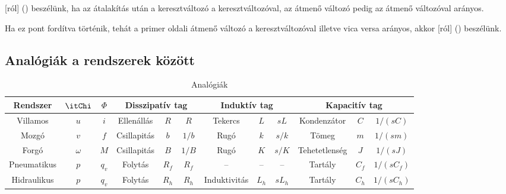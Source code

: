 \documentclass[../main.tex]{subfiles}
\begin{document}
[ról] () beszélünk, ha az átalakítás után a keresztváltozó
a keresztváltozóval, az átmenő változó pedig az átmenő változóval arányos.

Ha ez pont fordítva történik, tehát a primer oldali átmenő változó a keresztváltozóval
illetve vica versa arányos, akkor [ról] () beszélünk.

\subsection{Analógiák a rendszerek között}

\bgroup
\def\arraystretch{1.2}
\begin{table}[H]
  \centering
  \begin{adjustbox}{angle=90}
    \begin{tabular}{| c | c | c || c | c | c || c | c |c	|| c | c | c |}
      \hline
      Rendszer                              & $\itChi$ & $\varPhi$  &
      \multicolumn{3}{c||}{Disszipatív tag} &
      \multicolumn{3}{c||}{Induktív tag}    &
      \multicolumn{3}{c|}{Kapacitív tag}
      \\ \hline \hline
      Villamos                              & $u$      & $i$        &
      Ellenállás                            & $R$      & $R$        &
      Tekercs                               & $L$      & $sL$       &
      Kondenzátor                           & $C$      & $1/(sC)$
      \\ \hline
      Mozgó                                 & $v$      & $f$        &
      Csillapitás                           & $b$      & $1/b$      &
      Rugó                                  & $k$      & $s/k$      &
      Tömeg                                 & $m$      & $1/(sm)$
      \\ \hline
      Forgó                                 & $\omega$ & $M$        &
      Csillapitás                           & $B$      & $1/B$      &
      Rugó                                  & $K$      & $s/K$      &
      Tehetetlenség                         & $J$      & $1/(sJ)$
      \\ \hline
      Pneumatikus                           & $p$      & $q_v$      &
      Folytás                               & $R_f$    & $R_f$      &
      --                                    & --       & --         &
      Tartály                               & $C_f$    & $1/(sC_f)$
      \\ \hline
      Hidraulikus                           & $p$      & $q_v$      &
      Folytás                               & $R_h$    & $R_h$      &
      Induktivitás                          & $L_h$    & $sL_h$     &
      Tartály                               & $C_h$    & $1/(sC_h)$
      \\ \hline
    \end{tabular}
  \end{adjustbox}
  \caption{Analógiák}
  \label{fig:analogies}
\end{table}
\egroup
\end{document}
